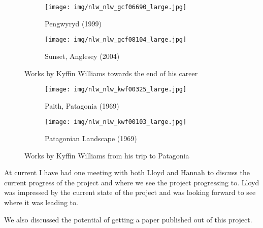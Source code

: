 \begin{figure}[h]
\centering
\begin{subfigure}[b]{0.4\textwidth}
  \centering
  \texttt{[image: img/nlw\_nlw\_gcf06690\_large.jpg]}
  \caption{Pengwyryd (1999)}
\end{subfigure}
\begin{subfigure}[b]{0.4\textwidth}
  \centering
  \texttt{[image: img/nlw\_nlw\_gcf08104\_large.jpg]}
  \caption{Sunset, Anglesey (2004)}
\end{subfigure}
\caption{Works by Kyffin Williams towards the end of his career}
\label{fig:kyffin-late}
\end{figure}

\begin{figure}[h]
\centering
\begin{subfigure}[b]{0.4\textwidth}
  \centering
  \texttt{[image: img/nlw\_nlw\_kwf00325\_large.jpg]}
  \caption{Paith, Patagonia (1969)}
\end{subfigure}
\begin{subfigure}[b]{0.4\textwidth}
  \centering
  \texttt{[image: img/nlw\_nlw\_kwf00103\_large.jpg]}
  \caption{Patagonian Landscape (1969)}
\end{subfigure}
\caption{Works by Kyffin Williams from his trip to Patagonia}
\label{fig:kyffin-patagonia}
\end{figure}

At current I have had one meeting with both Lloyd and Hannah to discuss the current progress of 
the project and where we see the project progressing to. Lloyd was impressed by the current state
of the project and was looking forward to see where it was leading to.

We also discussed the potential of getting a paper published out of this project.

